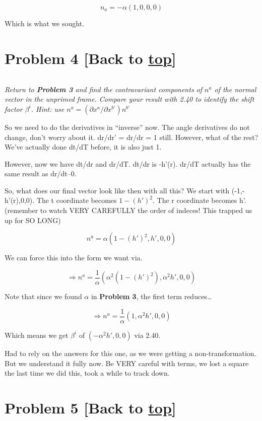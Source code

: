 \documentclass[landscape,letterpaper,10pt,english]{article}
\begin{document}
\[ n_a = -\alpha(1,0,0,0) \]

Which is what we sought.

    \hypertarget{problem-4-back-to-top}{%
\section{\texorpdfstring{Problem 4 {[}Back to
\hyperref[toc]{top}{]}}{Problem 4 {[}Back to {]}}}\label{problem-4-back-to-top}}

\[\label{P4}\]

\emph{Return to \textbf{Problem 3} and find the contravariant components
of \(n^a\) of the normal vector in the unprimed frame. Compare your
result with 2.40 to identify the shift factor \(\beta^i\). Hint: use
\(n^a = (\partial x^a / \partial x^{b'}) n^{b'}\)}

    So we need to do the derivatives in ``inverse'' now. The angle
derivatives do not change, don't worry about it. dr/dr' = dr/dr = 1
still. However, what of the rest? We've actually done dt/dT before, it
is also just 1.

However, now we have dt/dr and dr/dT. dt/dr is -h'(r). dr/dT actually
has the same result as dr/dt--0.

So, what does our final vector look like then with all this? We start
with (-1,-h'(r),0,0). The t coordinate becomes \(1-(h')^2\). The r
coordinate becomes h'. (remember to watch VERY CAREFULLY the order of
indeces! This trapped us up for SO LONG)

\[ n^a = \alpha(1-(h')^2, h',0,0) \]

We can force this into the form we want via.

\[ \Rightarrow n^a = \frac1\alpha(\alpha^2(1-(h')^2), \alpha^2h',0,0) \]

Note that since we found \(\alpha\) in \textbf{Problem 3}, the first
term reduces\ldots{}

\[ \Rightarrow n^a = \frac1\alpha(1, \alpha^2h',0,0) \]

Which means we get \(\beta^i\) of \((-\alpha^2 h',0,0)\) via 2.40.

Had to rely on the answers for this one, as we were getting a
non-transformation. But we understand it fully now. Be VERY careful with
terms, we lost a square the last time we did this, took a while to track
down.

    \hypertarget{problem-5-back-to-top}{%
\section{\texorpdfstring{Problem 5 {[}Back to
\hyperref[toc]{top}{]}}{Problem 5 {[}Back to {]}}}\label{problem-5-back-to-top}}
\end{document}
